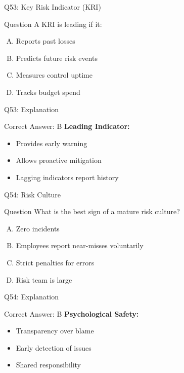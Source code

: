 \documentclass{beamer}
\begin{document}
			\begin{frame}{Q53: Key Risk Indicator (KRI)}
				\begin{block}{Question}
					A KRI is leading if it:
				\end{block}
				\begin{enumerate}[(A)]
					\item Reports past losses
					\item Predicts future risk events
					\item Measures control uptime
					\item Tracks budget spend
				\end{enumerate}
			\end{frame}
			\begin{frame}{Q53: Explanation}
				\begin{block}{Correct Answer: B}
					\textbf{Leading Indicator:}
					\begin{itemize}
						\item Provides early warning
						\item Allows proactive mitigation
						\item Lagging indicators report history
					\end{itemize}
				\end{block}
			\end{frame}
			
			\begin{frame}{Q54: Risk Culture}
				\begin{block}{Question}
					What is the best sign of a mature risk culture?
				\end{block}
				\begin{enumerate}[(A)]
					\item Zero incidents
					\item Employees report near-misses voluntarily
					\item Strict penalties for errors
					\item Risk team is large
				\end{enumerate}
			\end{frame}
			\begin{frame}{Q54: Explanation}
				\begin{block}{Correct Answer: B}
					\textbf{Psychological Safety:}
					\begin{itemize}
						\item Transparency over blame
						\item Early detection of issues
						\item Shared responsibility
					\end{itemize}
				\end{block}
			\end{frame}
			
\end{document}
